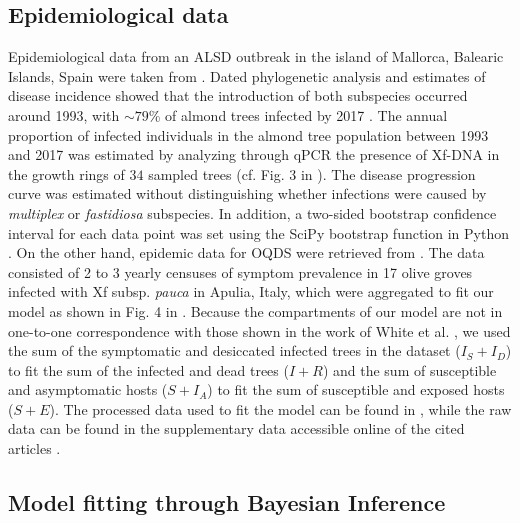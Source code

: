 \subsection{Epidemiological data}

Epidemiological data from an ALSD outbreak in the island of Mallorca,
Balearic Islands, Spain were taken from \cite{Moralejo2020}. Dated phylogenetic
analysis and estimates of disease incidence showed that the introduction of
both subspecies occurred around 1993, with $\sim 79$\% of almond trees infected
by 2017 \cite{Moralejo2020}. The annual proportion of infected individuals in
the almond tree population between 1993 and 2017 was estimated by analyzing
through qPCR the presence of Xf-DNA in the growth rings of $34$ sampled trees
(cf. Fig. 3 in \cite{Moralejo2020}). The disease progression curve was
estimated without distinguishing whether infections were caused by
\textit{multiplex} or \textit{fastidiosa} subspecies. In addition, a two-sided
bootstrap confidence interval for each data point was set using the SciPy
bootstrap function in Python \cite{SciPy}. On the other hand, epidemic data
for OQDS were retrieved from \cite{White2020}. The data consisted of 2 to 3
yearly censuses of symptom prevalence in 17 olive groves infected with Xf
subsp. \textit{pauca} in Apulia, Italy, which were aggregated to fit our model
as shown in Fig. 4 in \cite{White2020}. Because the compartments of our model
are not in one-to-one correspondence with those shown in the work of White et
al. \cite{White2020}, we used the sum of the symptomatic and desiccated
infected trees in the dataset ($I_S+I_D$) to fit the sum of the infected and
dead trees ($I+R$) and the sum of susceptible and asymptomatic hosts ($S+I_A$)
to fit the sum of susceptible and exposed hosts ($S+E$). The processed data
used to fit the model can be found in \cite{CODE}, while the raw data can be
found in the supplementary data accessible online of the cited articles
\cite{Moralejo2020,White2020}.

\subsection{Model fitting through Bayesian Inference}

